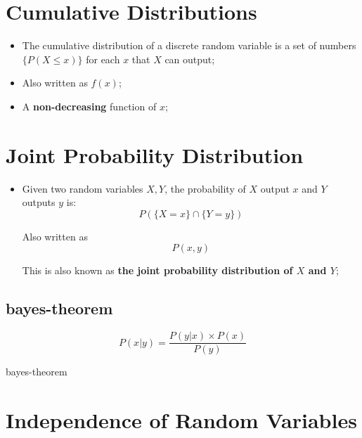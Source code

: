 \section{Cumulative Distributions}

  \begin{itemize}
    \item The cumulative distribution of a discrete random variable is a set of numbers $ \{ P \left( X \leq x \right) \} $ for each $ x $ that $ X $ can output;
    \item Also written as $ f \left( x \right) $;
    \item A \textbf{non-decreasing} function of $ x $;
  \end{itemize}

\section{Joint Probability Distribution}

  \begin{itemize}
    \item Given two random variables $ X, Y $, the probability of $ X $ output $ x $ and $ Y $ outputs $ y $ is:
    \begin{displaymath}
      P(\{ X = x \} \cap \{ Y = y \})
    \end{displaymath}

    Also written as
    \begin{displaymath}
      P(x, y)
    \end{displaymath}

    This is also known as \textbf{the joint probability distribution of $ X $ and $ Y $};
  \end{itemize}

  \subsection{\Gls{bayes-theorem}}

    \begin{equation}
      P \left( x|y \right) = \frac{ P \left( y|x \right) \times P \left( x \right) }{ P \left( y \right) }
    \end{equation}

    \glsdesc{bayes-theorem}

\section{Independence of Random Variables}

